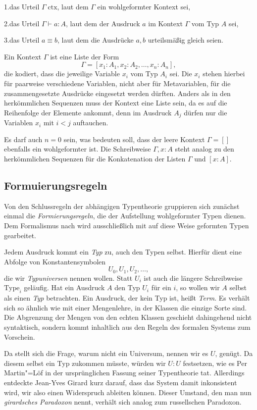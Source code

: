 1.\;das Urteil $\Gamma\;\mathrm{ctx}$, laut dem $\Gamma$ ein
wohlgeformter Kontext sei,

2.\;das Urteil $\Gamma\vdash a\colon A$, laut dem der Ausdruck
$a$ im Kontext $\Gamma$ vom Typ $A$ sei,

3.\;das Urteil $a\equiv b$, laut dem die Ausdrücke
$a,b$ urteilsmäßig gleich seien.

Ein Kontext $\Gamma$ ist eine Liste der Form
\[\Gamma = [x_1\colon A_1,x_2\colon A_2,\ldots,x_n\colon A_n],\]
die kodiert, dass die jeweilige Variable $x_i$ vom Typ $A_i$ sei. Die $x_i$
stehen hierbei für paarweise verschiedene Variablen, nicht aber für
Metavariablen, für die zusammengesetzte Ausdrücke eingesetzt werden
dürften. Anders als in den herkömmlichen Sequenzen muss der Kontext
eine Liste sein, da es auf die Reihenfolge der Elemente ankommt, denn
im Ausdruck $A_j$ dürfen nur die Variablen $x_i$ mit $i<j$ auftauchen.

Es darf auch $n=0$ sein, was bedeuten soll, dass der leere Kontext
$\Gamma=[]$ ebenfalls ein wohlgeformter ist. Die Schreibweise
$\Gamma,x\colon A$ steht analog zu den herkömmlichen Sequenzen für die
Konkatenation der Listen $\Gamma$ und $[x\colon A]$.

\subsection{Formuierungsregeln}

Von den Schlussregeln der abhängigen Typentheorie gruppieren sich
zunächst einmal die \emph{Formierungsregeln}, die der Aufstellung
wohlgeformter Typen dienen. Dem Formalismus nach wird ausschließlich
mit auf diese Weise geformten Typen gearbeitet.

Jedem Ausdruck kommt ein \emph{Typ} zu, auch den Typen selbst. Hierfür
dient eine Abfolge von Konstantensymbolen
\[U_0,U_1,U_2,\ldots,\]
die wir \emph{Typuniversen}
nennen wollen. Statt $U_i$ ist auch die längere Schreibweise $\mathrm{Type}_i$
geläufig. Hat ein Ausdruck $A$ den Typ $U_i$ für ein $i$, so wollen wir $A$
selbst als einen \emph{Typ} betrachten. Ein Ausdruck, der kein Typ ist,
heißt \emph{Term}. Es verhält sich so ähnlich wie mit einer Mengenlehre,
in der Klassen die einzige Sorte sind. Die Abgrenzung der Mengen von den
echten Klassen geschieht dahingehend nicht syntaktisch, sondern kommt
inhaltlich aus den Regeln des formalen Systems zum Vorschein.

Da stellt sich die Frage, warum nicht ein Universum, nennen wir es $U$,
genügt. Da diesem selbst ein Typ zukommen müsste, würden wir $U\colon U$
festsetzen, wie es Per Martin"=Löf
in der ursprünglichen Fassung seiner Typentheorie tat. Allerdings entdeckte
Jean-Yves Girard kurz darauf, dass
das System damit inkonsistent wird, wir also einen Widerspruch ableiten
können. Dieser Umstand, den man nun \emph{girardsches Paradoxon}%
 nennt, verhält sich analog zum russellschen
Paradoxon. \cite{Coquand-Type-Theory}

